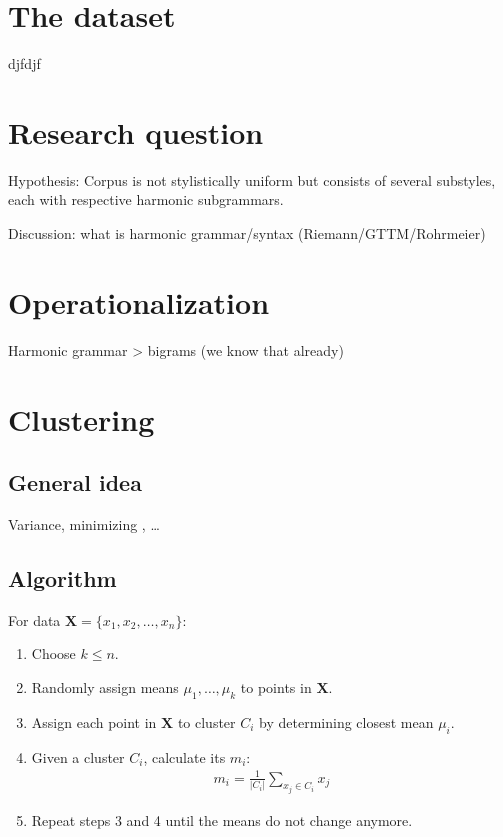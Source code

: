 \documentclass[letterpaper,10pt,english]{sphinxmanual}
\begin{document}
\section{The dataset}
\label{\detokenize{billboard:the-dataset}}
djfdjf


\section{Research question}
\label{\detokenize{billboard:research-question}}
Hypothesis: Corpus is not stylistically uniform but consists of several sub\sphinxhyphen{}styles,
each with respective harmonic sub\sphinxhyphen{}grammars.

Discussion: what is harmonic grammar/syntax (Riemann/GTTM/Rohrmeier)


\section{Operationalization}
\label{\detokenize{billboard:operationalization}}
Harmonic grammar \textendash{}\textgreater{} bigrams (we know that already)


\section{Clustering}
\label{\detokenize{billboard:clustering}}

\subsection{General idea}
\label{\detokenize{billboard:general-idea}}
Variance, minimizing , …


\subsection{Algorithm}
\label{\detokenize{billboard:algorithm}}
For data \(\mathbf{X}=\{x_1, x_2, \ldots, x_n\}\):
\begin{enumerate}
%
\item {} 
Choose \(k \leq n\).

\item {} 
Randomly assign means \(\mu_1, \ldots, \mu_k\) to points in \(\mathbf{X}\).

\item {} 
Assign each point in \(\mathbf{X}\) to cluster \(C_i\) by determining closest mean \(\mu_i\).

\item {} 
Given a cluster \(C_i\), calculate its  \(m_i\):
\begin{align*}
   m_i =\frac{1}{|C_i|}\sum_{x_j \in C_i} x_j
\end{align*}
\item {} 
Repeat steps 3 and 4 until the means do not change anymore.

\end{enumerate}
\end{document}
